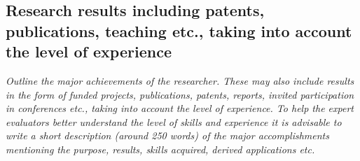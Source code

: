 \documentclass[a4paper,11pt]{article}
\newenvironment{xcomment}{\em}{}
\begin{document}

\subsection{Research results including patents, publications, teaching etc., taking into account the level of experience}
\begin{xcomment}
    Outline the major achievements of the researcher. These may also include results in the form of
  funded projects, publications, patents, reports, invited participation in conferences etc., taking into
  account the level of experience. To help the expert evaluators better understand the level of skills
  and experience it is advisable to write a short description (around 250 words) of the major
  accomplishments mentioning the purpose, results, skills acquired, derived applications etc.
\end{xcomment}
\end{document}
